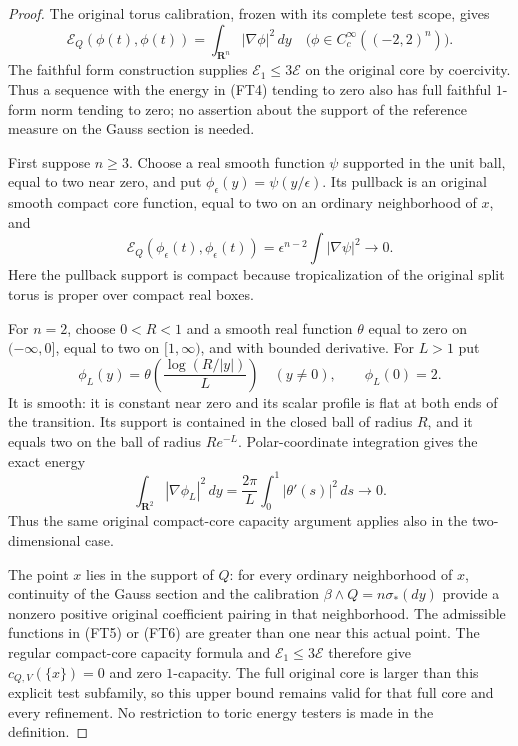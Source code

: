 \documentclass[11pt,a4paper]{article}
\numberwithin{equation}{section}
\theoremstyle{definition}
\theoremstyle{remark}
\begin{document}
\begin{proof}
The original torus calibration, frozen with its complete
test scope, gives
\[
 \mathcal E_Q(\phi(t),\phi(t))
                         =\int_{\mathbf R^n}|\nabla\phi|^2\,dy
       \quad\bigl(\phi\in C_c^\infty((-2,2)^n)\bigr).
 \tag{FT4}
\]
The faithful form construction supplies
$\mathcal E_1\leq3\mathcal E$ on the original core by
coercivity. Thus a sequence with the energy in (FT4) tending
to zero also has full faithful $1$-form norm tending to zero;
no assertion about the support of the reference measure on
the Gauss section is needed.

First suppose $n\geq3$. Choose a real smooth function
$\psi$ supported in the unit ball, equal to two near zero,
and put $\phi_\epsilon(y)=\psi(y/\epsilon)$.
Its pullback is an original smooth compact core function,
equal to two on an ordinary neighborhood of $x$, and
\[
 \mathcal E_Q(\phi_\epsilon(t),\phi_\epsilon(t))
      =\epsilon^{n-2}\int|\nabla\psi|^2\longrightarrow0.
 \tag{FT5}
\]
Here the pullback support is compact because tropicalization
of the original split torus is proper over compact real boxes.

For $n=2$, choose $0<R<1$ and a smooth real function
$\theta$ equal to zero on $(-\infty,0]$, equal to two on
$[1,\infty)$, and with bounded derivative. For $L>1$ put
\[
 \phi_L(y)=\theta\left(\frac{\log(R/|y|)}L\right)
       \quad(y\ne0),\qquad \phi_L(0)=2.
 \tag{FT6}
\]
It is smooth: it is constant near zero and its scalar profile
is flat at both ends of the transition. Its support is contained
in the closed ball of radius $R$, and it equals two on the
ball of radius $Re^{-L}$. Polar-coordinate integration gives
the exact energy
\[
       \int_{\mathbf R^2}|\nabla\phi_L|^2\,dy
                      =\frac{2\pi}{L}
                                 \int_0^1|\theta'(s)|^2\,ds
                      \longrightarrow0.
 \tag{FT7}
\]
Thus the same original compact-core capacity argument applies
also in the two-dimensional case.

The point $x$ lies in the support of $Q$: for every ordinary
neighborhood of $x$, continuity of the Gauss section and the
calibration $\beta\wedge Q=n\sigma_*(dy)$ provide a
nonzero positive original coefficient pairing in that
neighborhood. The admissible functions in (FT5) or (FT6)
are greater than one near this actual point. The regular
compact-core capacity formula and $\mathcal E_1\leq3\mathcal E$
therefore give $c_{Q,V}(\{x\})=0$ and zero $1$-capacity.
The full original core is larger than this explicit test
subfamily, so this upper bound remains valid for that full
core and every refinement. No restriction to toric energy
testers is made in the definition.


\end{proof}
\end{document}
